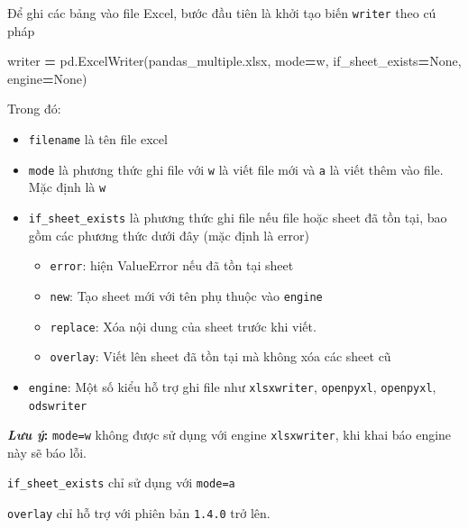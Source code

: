 \documentclass[
]{book}
\makeatletter
\newenvironment{Shaded}{\begin{snugshade}}{\end{snugshade}}
\newcommand{\NormalTok}[1]{#1}
\newcommand{\OperatorTok}[1]{\textcolor[rgb]{0.81,0.36,0.00}{\textbf{#1}}}
\newcommand{\StringTok}[1]{\textcolor[rgb]{0.31,0.60,0.02}{#1}}
\newcommand{\VariableTok}[1]{\textcolor[rgb]{0.00,0.00,0.00}{#1}}
\newenvironment{kframe}{%
\medskip{}
\setlength{\fboxsep}{.8em}
 \def\at@end@of@kframe{}%
 \ifinner\ifhmode%
  \def\at@end@of@kframe{\end{minipage}}%
  \begin{minipage}{\columnwidth}%
 \fi\fi%
 \def\FrameCommand##1{\hskip\@totalleftmargin \hskip-\fboxsep
 \colorbox{shadecolor}{##1}\hskip-\fboxsep
     \hskip-\linewidth \hskip-\@totalleftmargin \hskip\columnwidth}%
 \MakeFramed {\advance\hsize-\width
   \@totalleftmargin\z@ \linewidth\hsize
   \@setminipage}}%
 {\par\unskip\endMakeFramed%
 \at@end@of@kframe}
\newenvironment{rmdblock}[1]
  {
  \begin{itemize}
  \renewcommand{\labelitemi}{
    \raisebox{-.7\height}[0pt][0pt]{
      {\setkeys{Gin}{width=3em,keepaspectratio}\texttt{[image: images/\#1]}}
    }
  }
  \setlength{\fboxsep}{1em}
  \begin{kframe}
  \item
  }
  {
  \end{kframe}
  \end{itemize}
  }
\newenvironment{rmdnote}
  {\begin{rmdblock}{note}}
  {\end{rmdblock}}
\makeatother
\begin{document}
Để ghi các bảng vào file Excel, bước đầu tiên là khởi tạo biến \texttt{writer} theo cú pháp

\begin{Shaded}
\begin{Highlighting}[]
\NormalTok{writer }\OperatorTok{=}\NormalTok{ pd.ExcelWriter(}\StringTok{\textquotesingle{}pandas\_multiple.xlsx\textquotesingle{}}\NormalTok{, mode}\OperatorTok{=}\StringTok{\textquotesingle{}w\textquotesingle{}}\NormalTok{,  if\_sheet\_exists}\OperatorTok{=}\VariableTok{None}\NormalTok{, engine}\OperatorTok{=}\VariableTok{None}\NormalTok{)}
\end{Highlighting}
\end{Shaded}

Trong đó:

\begin{itemize}
\item
  \texttt{filename} là tên file excel
\item
  \texttt{mode} là phương thức ghi file với \texttt{w} là viết file mới và \texttt{a} là viết thêm vào file. Mặc định là \texttt{w}
\item
  \texttt{if\_sheet\_exists} là phương thức ghi file nếu file hoặc sheet đã tồn tại, bao gồm các phương thức dưới đây (mặc định là error)

  \begin{itemize}
  \item
    \texttt{error}: hiện ValueError nếu đã tồn tại sheet
  \item
    \texttt{new}: Tạo sheet mới với tên phụ thuộc vào \texttt{engine}
  \item
    \texttt{replace}: Xóa nội dung của sheet trước khi viết.
  \item
    \texttt{overlay}: Viết lên sheet đã tồn tại mà không xóa các sheet cũ
  \end{itemize}
\item
  \texttt{engine}: Một số kiểu hỗ trợ ghi file như \texttt{xlsxwriter}, \texttt{openpyxl}, \texttt{openpyxl}, \texttt{odswriter}
\end{itemize}

\begin{rmdnote}
\textbf{\emph{Lưu ý}:}
\texttt{mode=\textquotesingle{}w\textquotesingle{}} không được sử dụng với engine \texttt{xlsxwriter}, khi khai báo engine này sẽ báo lỗi.

\texttt{if\_sheet\_exists} chỉ sử dụng với \texttt{mode=\textquotesingle{}a\textquotesingle{}}

\texttt{overlay} chỉ hỗ trợ với phiên bản \texttt{1.4.0} trở lên.
\end{rmdnote}
\end{document}
